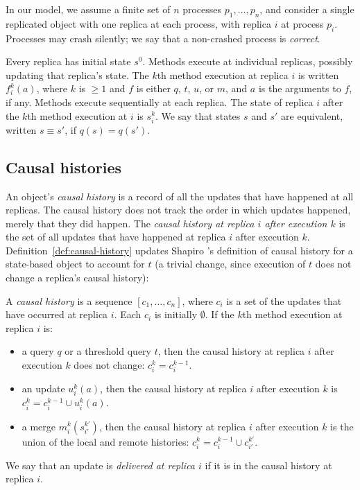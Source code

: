 In our model, we assume a finite set of $n$ processes $p_1, \dots,
p_n$, and consider a single replicated object with one replica at each
process, with replica $i$ at process $p_i$.  Processes may crash
silently; we say that a non-crashed process is \emph{correct}.

Every replica has initial state $s^0$.  Methods execute at individual
replicas, possibly updating that replica's state.  The $k$th method
execution at replica $i$ is written $f^{k}_{i}(a)$, where $k$ is $\geq
1$ and $f$ is either $q$, $t$, $u$, or $m$, and $a$ is the arguments
to $f$, if any.  Methods execute sequentially at each replica.  The
state of replica $i$ after the $k$th method execution at $i$ is
$s^{k}_{i}$.  We say that states $s$ and $s'$ are equivalent, written
$s \equiv s'$, if $q(s) = q(s')$.

\subsection{Causal histories}

An object's \emph{causal history} is a record of all the updates that
have happened at all replicas.  The causal history does not track the
order in which updates happened, merely that they did happen.  The
\emph{causal history at replica $i$ after execution $k$} is the set of
all updates that have happened at replica $i$ after execution $k$.
Definition~\ref{def:causal-history} updates Shapiro \etal's definition
of causal history for a state-based object to account for $t$ (a
trivial change, since execution of $t$ does not change a replica's
causal history):
\begin{definition}
  \label{def:causal-history}
  A \emph{causal history} is a sequence $[c_1, \dots, c_n]$, where
  $c_i$ is a set of the updates that have occurred at
  replica $i$.  Each $c_i$ is initially $\emptyset$.  If the $k$th
  method execution at replica $i$ is:
  \begin{itemize}
    \item a query $q$ or a threshold query $t$, then the causal
      history at replica $i$ after execution $k$ does not change:
      $c^{k}_{i} = c^{k-1}_{i}$.
    \item an update $u^{k}_{i}(a)$, then the causal history at replica
      $i$ after execution $k$ is $c^{k}_{i} = c^{k-1}_{i} \cup {
      u^{k}_{i}(a) }$.
    \item a merge $m^{k}_{i}(s^{k'}_{i'})$, then the causal history at
      replica $i$ after execution $k$ is the union of the local and
      remote histories: $c^{k}_{i} = c^{k-1}_{i} \cup c^{k'}_{i'}$.
  \end{itemize}
\end{definition}
We say that an update is \emph{delivered at replica $i$} if it is in
the causal history at replica $i$.

